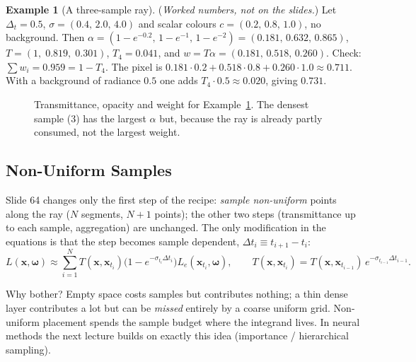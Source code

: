 \documentclass[11pt,a4paper]{article}
\newcommand{\x}{{\bm{x}}}
\newcommand{\w}{{\bm{\omega}}}
\theoremstyle{definition}
\newtheorem{example}[definition]{Example}
\theoremstyle{plain}
\theoremstyle{remark}
\begin{document}
\begin{example}[A three-sample ray]\label{ex:three}
(\emph{Worked numbers, not on the slides.}) Let $\Delta_t=0.5$, $\sigma=(0.4,\,2.0,\,4.0)$ and scalar colours $c=(0.2,\,0.8,\,1.0)$, no background. Then
$\alpha=(1-e^{-0.2},\,1-e^{-1},\,1-e^{-2})=(0.181,\,0.632,\,0.865)$, $T=(1,\;0.819,\;0.301)$, $T_4=0.041$, and
$w=T\alpha=(0.181,\,0.518,\,0.260)$.
Check: $\sum w_i=0.959=1-T_4$. The pixel is $0.181\cdot0.2+0.518\cdot0.8+0.260\cdot1.0\approx0.711$. With a background of radiance $0.5$ one adds $T_4\cdot0.5\approx0.020$, giving $0.731$.
\end{example}

\begin{figure}[h]
\centering
{}
\caption{Transmittance, opacity and weight for Example~\ref{ex:three}. The densest sample (3) has the largest $\alpha$ but, because the ray is already partly consumed, not the largest weight.}
\end{figure}

\subsection{Non-Uniform Samples}

Slide 64 changes only the first step of the recipe: \emph{sample non-uniform} points along the ray ($N$ segments, $N+1$ points); the other two steps (transmittance up to each sample, aggregation) are unchanged. The only modification in the equations is that the step becomes sample dependent, $\Delta t_i\equiv t_{i+1}-t_i$:
\[
L(\x,\w)\approx\sum_{i=1}^NT(\x,\x_{t_i})\bigl(1-e^{-\sigma_{t_i}\Delta t_i}\bigr)L_e(\x_{t_i},\w),\qquad T(\x,\x_{t_i})=T(\x,\x_{t_{i-1}})\,e^{-\sigma_{t_{i-1}}\Delta t_{i-1}} .
\]

\begin{intuition}
Why bother? Empty space costs samples but contributes nothing; a thin dense layer contributes a lot but can be \emph{missed} entirely by a coarse uniform grid. Non-uniform placement spends the sample budget where the integrand lives. In neural methods the next lecture builds on exactly this idea (importance / hierarchical sampling).
\end{intuition}
\end{document}
